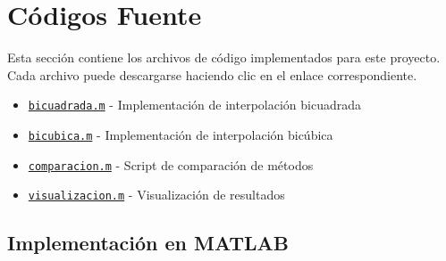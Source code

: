 \documentclass[12pt, a4paper]{article}
\begin{document}








\appendix
\section{Códigos Fuente}

Esta sección contiene los archivos de código implementados para este proyecto. 
Cada archivo puede descargarse haciendo clic en el enlace correspondiente.

\begin{itemize}
    \item \href{run:code/bicuadrada.m}{\texttt{bicuadrada.m}} - Implementación de interpolación bicuadrada
    \item \href{run:code/bicubica.m}{\texttt{bicubica.m}} - Implementación de interpolación bicúbica
    \item \href{run:code/comparacion.m}{\texttt{comparacion.m}} - Script de comparación de métodos
    \item \href{run:code/visualizacion.m}{\texttt{visualizacion.m}} - Visualización de resultados
\end{itemize}

\subsection{Implementación en MATLAB}




\end{document}
